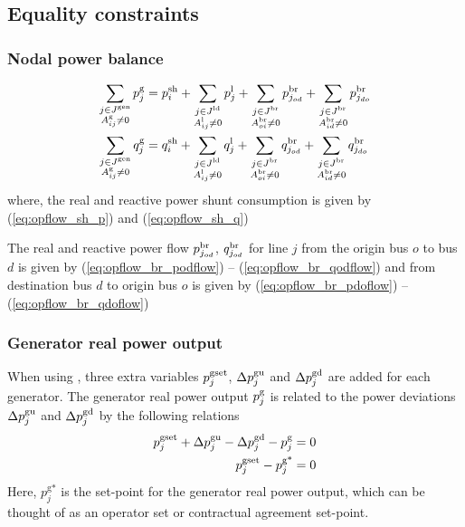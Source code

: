 \subsection{Equality constraints}\label{sec:opflow_eq}

\subsubsection{Nodal power balance}
\begin{align}
\sum_{\substack{j \in J^\text{gen} \\ A^{\text{g}}_{ij} \neq 0}} p^\text{g}_j &=   p^{\text{sh}}_i + \sum_{\substack{j \in J^\text{ld} \\ A^{\text{l}}_{ij} \neq 0}} p^{\text{l}}_j + \sum_{\substack{j \in J^\text{br} \\ A^{\text{br}}_{oi} \neq 0}} p^\text{br}_{j_{od}} + \sum_{\substack{j \in J^\text{br} \\ A^{\text{br}}_{id} \neq 0}} p^\text{br}_{j_{do}} \\
\sum_{\substack{j \in J^\text{gen} \\ A^{\text{g}}_{ij} \neq 0}} q^\text{g}_j &=  q^{\text{sh}}_i + \sum_{\substack{j \in J^\text{ld} \\ A^{\text{l}}_{ij} \neq 0}} q^{\text{l}}_j +
\sum_{\substack{j \in J^\text{br} \\ A^{\text{br}}_{oi} \neq 0}} q^\text{br}_{j_{od}} + \sum_{\substack{j \in J^\text{br} \\ A^{\text{br}}_{id} \neq 0}} q^\text{br}_{j_{do}} \\
\end{align}
where, the real and reactive power shunt consumption is given by (\ref{eq:opflow_sh_p}) and (\ref{eq:opflow_sh_q})


The real and reactive power flow $p^\text{br}_{j_{od}}$, $q^\text{br}_{j_{od}}$ for line $j$ from the origin bus $o$ to bus $d$ is given by (\ref{eq:opflow_br_podflow}) -- 
 (\ref{eq:opflow_br_qodflow})
and from destination bus $d$ to origin bus $o$ is given by (\ref{eq:opflow_br_pdoflow}) -- 
 (\ref{eq:opflow_br_qdoflow})

\subsubsection{Generator real power output}

When using \option{\opflowgensetpoint}, three extra variables $p^{\text{gset}}_j$, $\Delta{p}^\text{gu}_j$ and $\Delta{p}^\text{gd}_j$ are added for each generator. The generator real power output $p^\text{g}_j$ is related to the power deviations $\Delta{p}^\text{gu}_j$ and $\Delta{p}^\text{gd}_j$ by the following relations
\begin{align}
  p^{\text{gset}}_j + \Delta{p}^\text{gu}_j - \Delta{p}^\text{gd}_j - p^\text{g}_j = 0 \\
  p^{\text{gset}}_j - p^{\text{g*}}_j = 0
\end{align}
Here, $p^{\text{g*}}_j$ is the set-point for the generator real power output, which can be thought of as an operator set or contractual agreement set-point.

